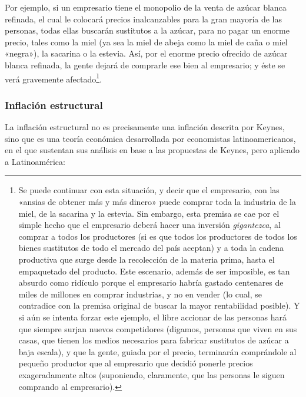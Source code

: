 \documentclass[12pt,a4paper,twoside]{book}
\begin{document}
Por ejemplo, si un empresario tiene el monopolio de la venta de azúcar blanca refinada, el cual le colocará precios inalcanzables para la gran mayoría de las personas, todas ellas buscarán sustitutos a la azúcar, para no pagar un enorme precio, tales como la miel (ya sea la miel de abeja como la miel de caña o miel «negra»), la sacarina o la estevia. Así, por el enorme precio ofrecido de azúcar blanca refinada, la gente dejará de comprarle ese bien al empresario; y éste se verá gravemente afectado\footnote{Se puede continuar con esta situación, y decir que el empresario, con las «ansias de obtener más y más dinero» puede comprar toda la industria de la miel, de la sacarina y la estevia. Sin embargo, esta premisa se cae por el simple hecho que el empresario deberá hacer una inversión \textit{gigantezca}, al comprar a todos los productores (si es que todos los productores de todos los bienes sustitutos de todo el mercado del país aceptan) y a toda la cadena productiva que surge desde la recolección de la materia prima, hasta el empaquetado del producto. Este escenario, además de ser imposible, es tan absurdo como ridículo porque el empresario habría gastado centenares de miles de millones en comprar industrias, y no en vender (lo cual, se contradice con la premisa original de buscar la mayor rentabilidad posible). Y si aún se intenta forzar este ejemplo, el libre accionar de las personas hará que siempre surjan nuevos competidores (digamos, personas que viven en sus casas, que tienen los medios necesarios para fabricar sustitutos de azúcar a baja escala), y que la gente, guiada por el precio, terminarán comprándole al pequeño productor que al empresario que decidió ponerle precios exageradamente altos (suponiendo, claramente, que las personas le siguen comprando al empresario).}.

\subsubsection{Inflación estructural}
La inflación estructural no es precisamente una inflación descrita por Keynes, sino que es una teoría económica desarrollada por economistas latinoamericanos, en el que sustentan sus análisis en base a las propuestas de Keynes, pero aplicado a Latinoamérica:
\end{document}
